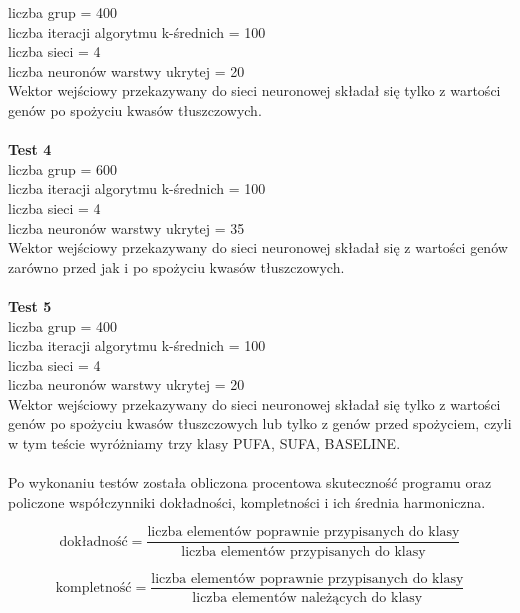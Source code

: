 \documentclass{classrep}
\begin{document}
liczba grup = 400\\
liczba iteracji algorytmu k-średnich = 100\\
liczba sieci = 4\\
liczba neuronów warstwy ukrytej = 20\\
Wektor wejściowy przekazywany do sieci neuronowej składał się tylko z wartości genów po spożyciu kwasów tłuszczowych.\\\\
\textbf{Test 4}\\
liczba grup = 600\\
liczba iteracji algorytmu k-średnich = 100\\
liczba sieci = 4\\
liczba neuronów warstwy ukrytej = 35\\
Wektor wejściowy przekazywany do sieci neuronowej składał się z wartości genów zarówno przed jak i po spożyciu kwasów tłuszczowych.\\\\
\textbf{Test 5}\\
liczba grup = 400\\
liczba iteracji algorytmu k-średnich = 100\\
liczba sieci = 4\\
liczba neuronów warstwy ukrytej = 20\\
Wektor wejściowy przekazywany do sieci neuronowej składał się tylko z wartości genów po spożyciu kwasów tłuszczowych lub tylko z genów przed spożyciem, czyli w tym teście wyróżniamy trzy klasy PUFA, SUFA, BASELINE.\\\\

Po wykonaniu testów została obliczona procentowa skuteczność programu oraz policzone współczynniki dokładności, kompletności i ich średnia harmoniczna.

\begin{equation}
\mbox{dokładność} = \frac{\mbox{liczba elementów poprawnie przypisanych do klasy}}{\mbox{liczba elementów przypisanych do klasy}}
\end{equation}

\begin{equation}
\mbox{kompletność} = \frac{\mbox{liczba elementów poprawnie przypisanych do klasy}}{\mbox{liczba elementów należących do klasy}}
\end{equation}
\end{document}
